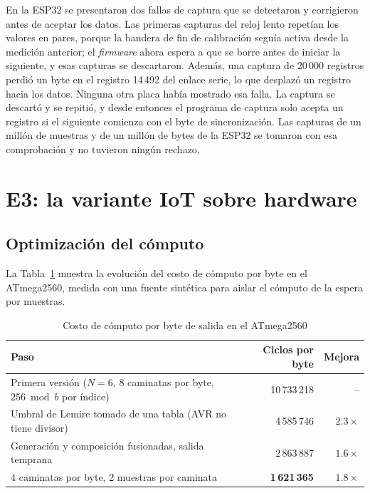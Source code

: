En la ESP32 se presentaron dos fallas de captura que se detectaron y corrigieron antes de aceptar los datos. Las primeras capturas del reloj lento repetían los valores en pares, porque la bandera de fin de calibración seguía activa desde la medición anterior; el \textit{firmware} ahora espera a que se borre antes de iniciar la siguiente, y esas capturas se descartaron. Además, una captura de 20\,000 registros perdió un byte en el registro 14\,492 del enlace serie, lo que desplazó un registro hacia los datos. Ninguna otra placa había mostrado esa falla. La captura se descartó y se repitió, y desde entonces el programa de captura solo acepta un registro si el siguiente comienza con el byte de sincronización. Las capturas de un millón de muestras y de un millón de bytes de la ESP32 se tomaron con esa comprobación y no tuvieron ningún rechazo.

\section{E3: la variante IoT sobre hardware}
\label{sec:res_iot}

\subsection{Optimización del cómputo}

La Tabla~\ref{tab:res_optimizacion} muestra la evolución del costo de cómputo por byte en el ATmega2560, medida con una fuente sintética para aislar el cómputo de la espera por muestras.

\begin{table}[H]
\centering
\caption{Costo de cómputo por byte de salida en el ATmega2560}
\label{tab:res_optimizacion}
\begin{tabularx}{\textwidth}{@{}Xrr@{}}
\toprule
\textbf{Paso} & \textbf{Ciclos por byte} & \textbf{Mejora} \\
\midrule
Primera versión ($N = 6$, 8 caminatas por byte, $256 \bmod b$ por índice) & 10\,733\,218 & -- \\
Umbral de Lemire tomado de una tabla (AVR no tiene divisor) & 4\,585\,746 & $2.3\times$ \\
Generación y composición fusionadas, salida temprana & 2\,863\,887 & $1.6\times$ \\
4 caminatas por byte, 2 muestras por caminata & \textbf{1\,621\,365} & $1.8\times$ \\
\bottomrule
\end{tabularx}
\end{table}

